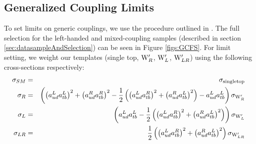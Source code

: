 \subsection{Generalized Coupling Limits}
\label{sec:GCTheta}
To set limits on generic couplings, we use the procedure outlined in \cite{CMS-PAS-B2G-12-010}.  
The full selection for the left-handed and mixed-coupling samples (described in section \ref{sec:datasampleAndSelection}) can be seen in Figure \ref{figs:GCFS}.
For limit setting, we weight our templates (single top, $\mathrm{W}^\prime_R$, $\mathrm{W}^\prime_L$, $\mathrm{W}^\prime_{LR}$) using the following cross-sections respectively:
\begin{eqnarray}\label{eq:xsec}
{\sigma}_{SM} &=& {\sigma}_{\text{singletop}}\\\nonumber
{\sigma}_{R} &=& \left(\left(a^L_{ud} a^L_{tb}\right)^2 + \left(a^R_{ud} a^R_{tb}\right)^2 - \frac{1}{2}\left(\left(a^L_{ud} a^R_{tb}\right)^2 + \left(a^R_{ud} a^L_{tb}\right)^2\right) - a^L_{ud} a^L_{tb}\right){\sigma}_{\mathrm{W}^\prime_R}\\\nonumber
{\sigma}_{L} &=& \left(a^L_{ud} a^L_{tb}-\frac{1}{2}\left(\left(a^L_{ud} a^R_{tb}\right)^2 +\left(a^R_{ud} a^L_{tb}\right)^2\right)\right){\sigma}_{\mathrm{W}^\prime_L}\\\nonumber
{\sigma}_{LR} &=& \frac{1}{2}\left(\left(a^L_{ud} a^R_{tb}\right)^2 +\left(a^R_{ud} a^L_{tb}\right)^2\right){\sigma}_{\mathrm{W}^\prime_{LR}}\\\nonumber
\end{eqnarray}



